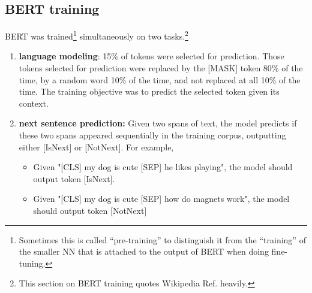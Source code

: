 \subsection{BERT training}
BERT was trained\footnote{Sometimes
this is called \enquote{pre-training}
to distinguish it from
the \enquote{training} of the  smaller NN that is attached to the output of
BERT when doing
fine-tuning.} simultaneously on two tasks.\footnote{This section on BERT training quotes Wikipedia Ref.\cite{wiki-BERT}
heavily.}


\begin{enumerate}
\item {\bf language modeling}: 15\% of tokens were selected for prediction. Those tokens
selected for
prediction
were replaced by the [MASK] token 80\% of the time,
by a random word 10\% of the time,
and not replaced at all 10\% of the time. The training objective was to predict the selected token given its context. 

\item{\bf next sentence prediction: }
Given two spans of text, the model predicts if these two spans appeared sequentially in the training corpus, outputting either [IsNext] or [NotNext].
For example,

\begin{itemize}
\item Given "[CLS] my dog is cute [SEP] he likes playing", the model should output token [IsNext].
\item Given "[CLS] my dog is cute [SEP] how do magnets work", the model should output token [NotNext]
\end{itemize}

\end{enumerate}

